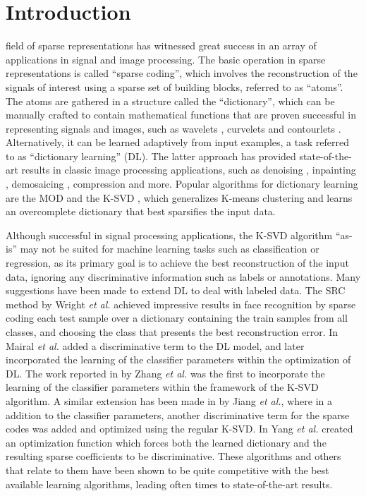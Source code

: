 \documentclass[journal]{IEEEtran}
\begin{document}
\IEEEpeerreviewmaketitle



\section{Introduction}

 field of sparse representations has witnessed great success in an array of applications in signal and image processing.
The basic operation in sparse representations is called ``sparse coding'', which involves the reconstruction of the signals of interest using a sparse set of building blocks, referred to as ``atoms''. The atoms are gathered in a structure called the ``dictionary'', which can be manually crafted to contain mathematical functions that are proven successful in representing signals and images, such as wavelets \cite{WaveletDic}, curvelets \cite{CurveletDic} and contourlets \cite{ContourletDic}. Alternatively, it can be learned adaptively from input examples, a task referred to as ``dictionary learning'' (DL). The latter approach has provided state-of-the-art results in classic image processing applications, such as denoising \cite{KSVDDenoising}, inpainting \cite{KSVDInpainting}, demosaicing \cite{SparseApplications}, compression \cite{KSVDCompression,KSVDCompression2} and more.
Popular algorithms for dictionary learning are the MOD \cite{MOD} and the K-SVD \cite{KSVD}, which generalizes K-means clustering and learns an overcomplete dictionary that best sparsifies the input data.

Although successful in signal processing applications, the K-SVD algorithm ``as-is'' may not be suited for machine learning tasks such as classification or regression, as its primary goal is to achieve the best reconstruction of the input data, ignoring any discriminative information such as labels or annotations.
Many suggestions have been made to extend DL to deal with labeled data. The SRC method by Wright \textit{et al.} \cite{Classification} achieved impressive results in face recognition by sparse coding each test sample over a dictionary containing the train samples from all classes, and choosing the class that presents the best reconstruction error. In \cite{SupevisedDic1,SupevisedDic2} Mairal \textit{et al.} added a discriminative term to the DL model, and later incorporated the learning of the classifier parameters within the optimization of DL. The work reported in \cite{DKSVD} by Zhang \textit{et al.} was the first to incorporate the learning of the classifier parameters within the framework of the K-SVD algorithm. A similar extension has been made in \cite{LCKSVD,LCKSVD2} by Jiang \textit{et al.}, where in a addition to the classifier parameters, another discriminative term for the sparse codes was added and optimized using the regular K-SVD. In \cite{FDDL} Yang \textit{et al.} created an optimization function which forces both the learned dictionary and the resulting sparse coefficients to be discriminative. These algorithms and others that relate to them have been shown to be quite competitive with the best available learning algorithms, leading often times to state-of-the-art results.
\end{document}
